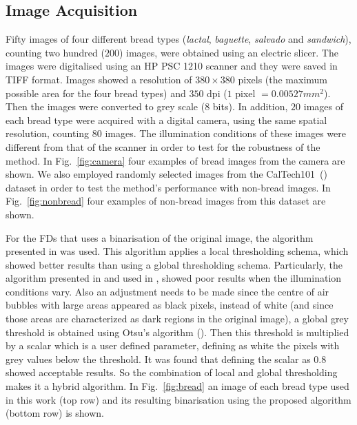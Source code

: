 \documentclass[oneside,a4paper,english,links]{amca}
\begin{document}
\subsection{Image Acquisition}
Fifty images of four different bread types ({\em lactal}, {\em baguette}, {\em salvado} and {\em sandwich}), counting two hundred ($200$) images, were obtained using an electric slicer. The images were digitalised using an HP PSC 1210 scanner and they were saved in TIFF format. Images showed a resolution of $380 \times 380$ pixels (the maximum possible area for the four bread types) and $350$ dpi ($1$ pixel $= 0.00527 mm^{2}$). Then the images were converted to grey scale ($8$ bits). In addition, $20$ images of each bread type were acquired with a digital camera, using the same spatial resolution, counting $80$ images. The illumination conditions of these images were different from that of the scanner in order to test for the robustness of the method. In Fig.~\ref{fig:camera} four examples of bread images from the camera are shown. We also employed randomly selected images from the CalTech101~(\cite{FeiFei04}) dataset in order to test the method's performance with non-bread images. In Fig.~\ref{fig:nonbread} four examples of non-bread images from this dataset are shown. 

For the FDs that uses a binarisation of the original image, the algorithm presented in \cite{White83} was used. This algorithm applies a local thresholding schema, which showed better results than using a global thresholding schema. Particularly, the algorithm presented in \cite{Huang95} and used in \cite{Gonzales2008}, showed poor results when the illumination conditions vary. Also an adjustment needs to be made since the centre of air bubbles with large areas appeared as black pixels, instead of white (and since those areas are characterized as dark regions in the original image), a global grey threshold is obtained using Otsu's algorithm (\cite{Otsu79}). Then this threshold is multiplied by a scalar which is a user defined parameter, defining as white the pixels with grey values below the threshold. It was found that defining the scalar as $0.8$ showed acceptable results. So the combination of local and global thresholding makes it a hybrid algorithm. In Fig.~\ref{fig:bread} an image of each bread type used in this work (top row) and its resulting binarisation using the proposed algorithm (bottom row) is shown.  
\end{document}
